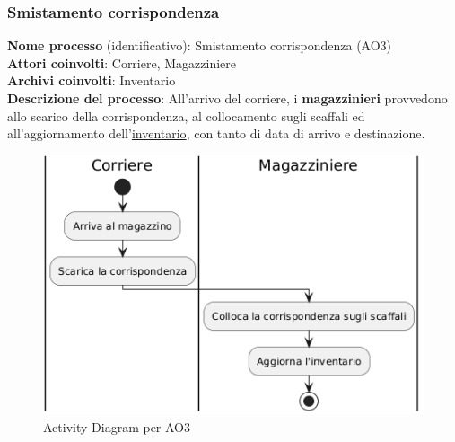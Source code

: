 \documentclass[a4paper,12pt]{article}
\begin{document}
\subsubsection{Smistamento corrispondenza}
\textbf{Nome processo} (identificativo): Smistamento corrispondenza (AO3)\\
\textbf{Attori coinvolti}: Corriere, Magazziniere \\
\textbf{Archivi coinvolti}: Inventario \\
\textbf{Descrizione del processo}: All'arrivo del corriere, i \textbf{magazzinieri} provvedono allo scarico della corrispondenza, al collocamento sugli scaffali ed
all'aggiornamento dell'\underline{inventario}, con tanto di data di arrivo e destinazione.
\begin{figure}[H]
  \centering
  \includegraphics[width=0.8\linewidth]{assets/activitydiagram_AO3.png}
	\caption{Activity Diagram per AO3}
\end{figure}
\end{document}
